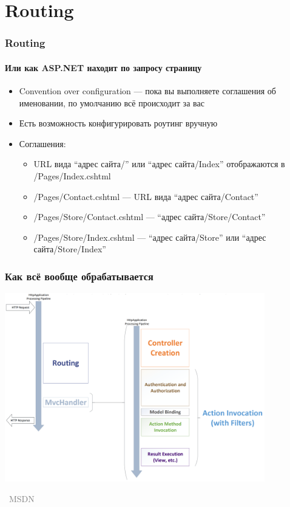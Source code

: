 \documentclass[xetex,mathserif,serif]{beamer}
\newcommand{\attribution}[1] {
\vspace{-5mm}\begin{flushright}\begin{scriptsize}\textcolor{gray}{\textcopyright\, #1}\end{scriptsize}\end{flushright}
}
\begin{document}
    \section{Routing}

    \begin{frame}
        \frametitle{Routing}
        \framesubtitle{Или как ASP.NET находит по запросу страницу}
        \begin{itemize}
            \item Convention over configuration --- пока вы выполняете соглашения об именовании, по умолчанию всё происходит за вас
            \item Есть возможность конфигурировать роутинг вручную
            \item Соглашения:
            \begin{itemize}
                \item URL вида ``адрес сайта/'' или ``адрес сайта/Index'' отображаются в /Pages/Index.cshtml
                \item /Pages/Contact.cshtml --- URL вида ``адрес сайта/Contact''
                \item /Pages/Store/Contact.cshtml --- ``адрес сайта/Store/Contact''
                \item /Pages/Store/Index.cshtml --- ``адрес сайта/Store'' или ``адрес сайта/Store/Index''
            \end{itemize}
        \end{itemize}
    \end{frame}

    \begin{frame}
        \frametitle{Как всё вообще обрабатывается}
        \begin{center}
            \includegraphics[width=0.85\textwidth]{requestLifecycle.png}
            \vspace{-5mm}
            \attribution{MSDN}
        \end{center}
    \end{frame}
\end{document}
